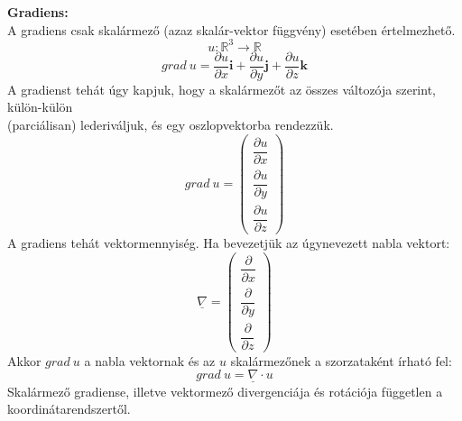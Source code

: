 \documentclass[11pt,a4paper]{article}
\begin{document}
    \begin{tcolorbox}[colback=red!5!white,colframe=red!60!black,title= 4. Gradiens{,} divergencia{,} rotáció I.]
    \textbf{Gradiens:} \\
    A gradiens csak skalármező (azaz skalár-vektor függvény) esetében értelmezhető.
    $$u:\mathbb{R}^3 \rightarrow \mathbb{R}$$
    $$grad\ u = \frac{\partial u}{\partial x}\textbf{i} + \frac{\partial u}{\partial y}\textbf{j} + \frac{\partial u}{\partial z}\textbf{k}$$
    A gradienst tehát úgy kapjuk, hogy a skalármezőt az összes változója szerint, külön-külön \\
    (parciálisan) lederiváljuk, és egy oszlopvektorba rendezzük.
    $$grad\ u =
    \begin{pmatrix}
        \dfrac{\partial u}{\partial x}\\[8pt]
        \dfrac{\partial u}{\partial y}\\[8pt]
        \dfrac{\partial u}{\partial z}
    \end{pmatrix}$$
    A gradiens tehát vektormennyiség. Ha bevezetjük az úgynevezett nabla vektort:
    $$\underline{\nabla} = 
    \begin{pmatrix}
        \dfrac{\partial}{\partial x}\\[8pt]
        \dfrac{\partial}{\partial y}\\[8pt]
        \dfrac{\partial}{\partial z}
    \end{pmatrix}$$
    Akkor $grad\ u$ a nabla vektornak és az $u$ skalármezőnek a szorzataként írható fel:
    $$grad\ u = \underline{\nabla} \cdot u$$
    Skalármező gradiense, illetve vektormező divergenciája és rotációja független a koordinátarendszertől.\\


\end{tcolorbox}
\end{document}
